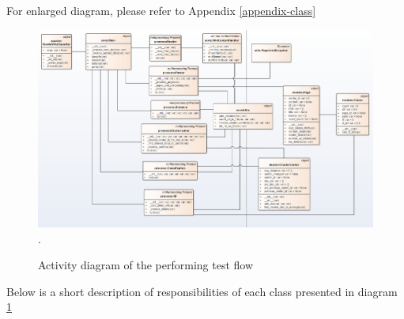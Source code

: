 For enlarged diagram, please refer to Appendix \ref{appendix-class}

\begin{figure}[H]
	\begin{center}
		\includegraphics[width=1.0\linewidth]{images/diagrams/class.png}.
		\caption{Activity diagram of the performing test flow}
		\label{design-class-diagram}
	\end{center}
\end{figure}

Below is a short description of responsibilities of each class presented in diagram \ref{design-class-diagram}

